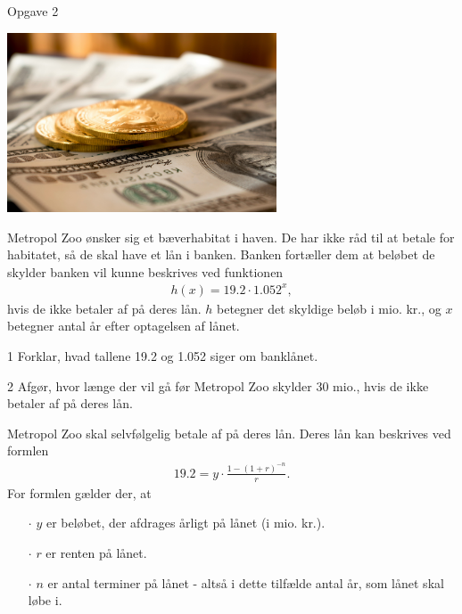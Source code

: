 \documentclass[12pt,x11names,a4paper]{article}
\begin{document}
\begin{opgavetekst}{Opgave 2}
	\begin{center}
		\includegraphics[width=0.6\textwidth]{Billeder/penge}
	\end{center}
	Metropol Zoo ønsker sig et bæverhabitat i haven. De har ikke råd til 
	at betale for habitatet, så de skal have et lån i banken. Banken fortæller 
	dem at beløbet de skylder banken vil kunne beskrives ved funktionen 
	\begin{align*}
		h(x) = 19.2\cdot 1.052^x,
	\end{align*}
	hvis de ikke betaler af på deres lån. $h$ betegner det skyldige beløb i mio. kr.,
	og $x$ betegner antal år efter optagelsen af lånet. 
\end{opgavetekst}
\begin{delopgave}{}{1}
	Forklar, hvad tallene 19.2 og 1.052 siger om banklånet.
\end{delopgave}
\begin{delopgave}{}{2}
	Afgør, hvor længe der vil gå før Metropol Zoo skylder 30 mio., hvis de ikke betaler af på
	deres lån.
\end{delopgave}
\begin{meretekst}
	Metropol Zoo skal selvfølgelig betale af på deres lån. Deres lån kan beskrives ved formlen
	\begin{align*}
		19.2 = y\cdot \frac{1 - (1+r)^{-n}}{r}.
	\end{align*}
	For formlen gælder der, at 
	\begin{itemize}
		\item[$\cdot$] $y$ er beløbet, der afdrages årligt på lånet (i mio. kr.).
		\item[$\cdot$] $r$ er renten på lånet. 
		\item[$\cdot$] $n$ er antal terminer på lånet - altså i dette tilfælde antal år, som 
		lånet skal løbe i.  	
	\end{itemize}
	\phantom{h}
\end{meretekst}	
\end{document}
